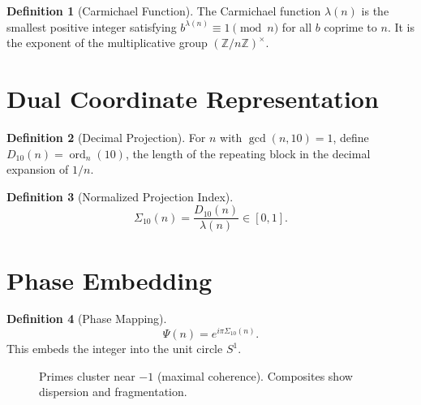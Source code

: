 \documentclass[11pt,a4paper]{article}
\theoremstyle{definition}
\newtheorem{definition}{Definition}[section]
\begin{document}
\begin{definition}[Carmichael Function]
The Carmichael function \( \lambda(n) \) is the smallest positive integer satisfying \( b^{\lambda(n)} \equiv 1 \pmod{n} \) for all \( b \) coprime to \( n \). It is the exponent of the multiplicative group \( (\mathbb{Z}/n\mathbb{Z})^\times \).
\end{definition}

\section{Dual Coordinate Representation}

\begin{definition}[Decimal Projection]
For \( n \) with \( \gcd(n,10)=1 \), define \( D_{10}(n) = \operatorname{ord}_n(10) \), the length of the repeating block in the decimal expansion of \( 1/n \).
\end{definition}

\begin{definition}[Normalized Projection Index]
\[ \Sigma_{10}(n) = \frac{D_{10}(n)}{\lambda(n)} \in [0,1]. \]
\end{definition}

\section{Phase Embedding}

\begin{definition}[Phase Mapping]
\[ \Psi(n) = e^{i \pi \Sigma_{10}(n)}. \]
This embeds the integer into the unit circle \( S^1 \).
\end{definition}

\begin{figure}[htbp]
\centering
{}
\caption{Primes cluster near $-1$ (maximal coherence). Composites show dispersion and fragmentation.}
\label{fig:phase}
\end{figure}
\end{document}

